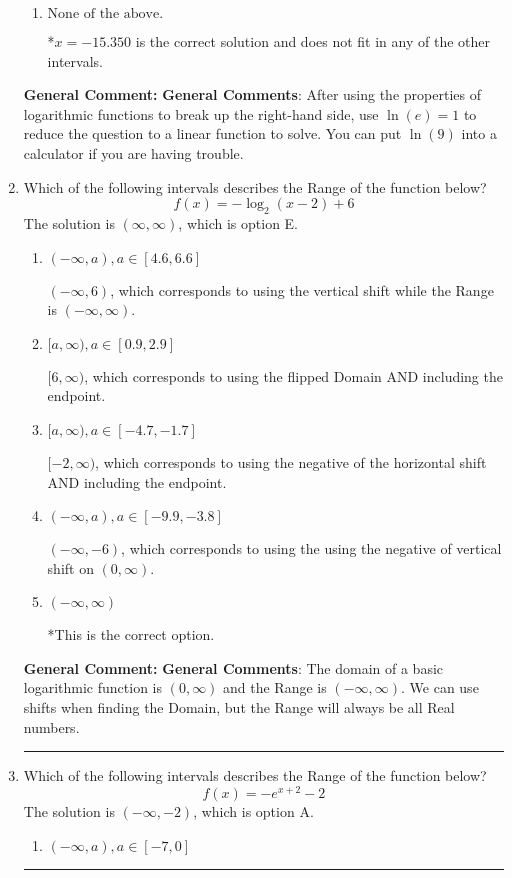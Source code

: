 \documentclass{extbook}[14pt]
\newcommand{\litem}[1]{\item #1

\rule{\textwidth}{0.4pt}}
\begin{document}
\begin{enumerate}
{\begin{enumerate}[label=\Alph*.]
This corresponds to believing you cannot solve the equation.
\item \( \text{None of the above.} \)

*$x = -15.350$ is the correct solution and does not fit in any of the other intervals.
\end{enumerate}

\textbf{General Comment:} \textbf{General Comments}: After using the properties of logarithmic functions to break up the right-hand side, use $\ln(e) = 1$ to reduce the question to a linear function to solve. You can put $\ln(9)$ into a calculator if you are having trouble.
}
\litem{
Which of the following intervals describes the Range of the function below?
\[ f(x) = -\log_2{(x-2)}+6 \]The solution is \( (\infty, \infty) \), which is option E.\begin{enumerate}[label=\Alph*.]
\item \( (-\infty, a), a \in [4.6, 6.6] \)

$(-\infty, 6)$, which corresponds to using the vertical shift while the Range is $(-\infty, \infty)$.
\item \( [a, \infty), a \in [0.9, 2.9] \)

$[6, \infty)$, which corresponds to using the flipped Domain AND including the endpoint.
\item \( [a, \infty), a \in [-4.7, -1.7] \)

$[-2, \infty)$, which corresponds to using the negative of the horizontal shift AND including the endpoint.
\item \( (-\infty, a), a \in [-9.9, -3.8] \)

$(-\infty, -6)$, which corresponds to using the using the negative of vertical shift on $(0, \infty)$.
\item \( (-\infty, \infty) \)

*This is the correct option.
\end{enumerate}

\textbf{General Comment:} \textbf{General Comments}: The domain of a basic logarithmic function is $(0, \infty)$ and the Range is $(-\infty, \infty)$. We can use shifts when finding the Domain, but the Range will always be all Real numbers.
}
\litem{
Which of the following intervals describes the Range of the function below?
\[ f(x) = -e^{x+2}-2 \]The solution is \( (-\infty, -2) \), which is option A.\begin{enumerate}[label=\Alph*.]
\item \( (-\infty, a), a \in [-7, 0] \)


\end{enumerate}}
\end{enumerate}
\end{document}
